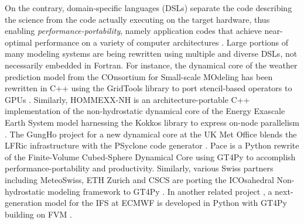 \documentclass[gmd,manuscript,online]{copernicus}
\theoremstyle{theorem}
\theoremstyle{definition}
\theoremstyle{remark}
\theoremstyle{proposition}
\begin{document}
	On the contrary, domain-specific languages (DSLs) separate the code describing the science from the code actually executing on the target hardware, thus enabling \emph{performance-portability}, namely application codes that achieve near-optimal performance on a variety of computer architectures \citep{deakin19}. Large portions of many modeling systems are being rewritten using multiple and diverse DSLs, not necessarily embedded in Fortran. For instance, the dynamical core of the weather prediction model from the COnsortium for Small-scale MOdeling \citep[COSMO;][]{baldauf11} has been rewritten in C++ using the GridTools library \citep{afanasyev21} to port stencil-based operators to GPUs \citep{fuhrer14, fuhrer18}. Similarly, HOMMEXX-NH \citep{bertagna20} is an architecture-portable C++ implementation of the non-hydrostatic dynamical core of the Energy Exascale Earth System model \citep[E3SM;][]{taylor20} harnessing the Kokkos library to express on-node parallelism \citep{edwards14}. The GungHo project for a new dynamical core at the UK Met Office \citep{melvin19, melvin24} blends the LFRic infrastructure with the PSyclone code generator \citep{adams19}. Pace \citep{ben-nun22, dahm23} is a Python rewrite of the Finite-Volume Cubed-Sphere Dynamical Core \citep[FV3;][]{harris13} using GT4Py to accomplish performance-portability and productivity. Similarly, various Swiss partners including MeteoSwiss, ETH Zurich and CSCS are porting the ICOsahedral Non-hydrostatic modeling framework \citep[ICON;][]{zangl15} to GT4Py \citep{luz24}. In another related project \citep{kuhnlein23}, a next-generation model for the IFS at ECMWF is developed in Python with GT4Py building on FVM \citep{smolarkiewicz16, kuehnlein19}.
\end{document}
